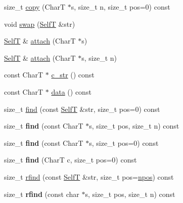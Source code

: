 \begin{CompactItemize}
\item 
size\_\-t \hyperlink{classvector__string_7583290c3d10030ebf722fcf5c5ca352}{copy} (CharT $\ast$s, size\_\-t n, size\_\-t pos=0) const 
\item 
void \hyperlink{classvector__string_a18b53a78ca97187d7145d9c004f5d54}{swap} (\hyperlink{classvector__string}{SelfT} \&str)
\item 
\hyperlink{classvector__string}{SelfT} \& \hyperlink{classvector__string_f0a88c736a417b3ba61ac3b5231b0fa7}{attach} (CharT $\ast$s)
\item 
\hyperlink{classvector__string}{SelfT} \& \hyperlink{classvector__string_2be6a4b71a784962fc9c8b619cf210d6}{attach} (CharT $\ast$s, size\_\-t n)
\item 
const CharT $\ast$ \hyperlink{classvector__string_77c74227c7fe23929099157581a23fd3}{c\_\-str} () const 
\item 
const CharT $\ast$ \hyperlink{classvector__string_96e3871846c162930623048ce8e053f1}{data} () const 
\item 
size\_\-t \hyperlink{classvector__string_5e64e995b1eea8c254bb5ade28fcbf0b}{find} (const \hyperlink{classvector__string}{SelfT} \&str, size\_\-t pos=0) const 
\item 
\hypertarget{classvector__string_b33895b9de08abfabe0cfba9581d91af}{
size\_\-t \textbf{find} (const CharT $\ast$s, size\_\-t pos, size\_\-t n) const }
\label{classvector__string_b33895b9de08abfabe0cfba9581d91af}

\item 
\hypertarget{classvector__string_799209bb6ba81df8147b7ab841efc557}{
size\_\-t \textbf{find} (const CharT $\ast$s, size\_\-t pos=0) const }
\label{classvector__string_799209bb6ba81df8147b7ab841efc557}

\item 
\hypertarget{classvector__string_a0efd758ef7648a13d8ec7b558817330}{
size\_\-t \textbf{find} (CharT c, size\_\-t pos=0) const }
\label{classvector__string_a0efd758ef7648a13d8ec7b558817330}

\item 
size\_\-t \hyperlink{classvector__string_75a476214f4b7888df557f566aa51b0a}{rfind} (const \hyperlink{classvector__string}{SelfT} \&str, size\_\-t pos=\hyperlink{classvector__string_073b48043937e79ead0703a49426be1a}{npos}) const 
\item 
\hypertarget{classvector__string_f9888434ea8216bee4def7d0af0fe9dd}{
size\_\-t \textbf{rfind} (const char $\ast$s, size\_\-t pos, size\_\-t n) const }
\label{classvector__string_f9888434ea8216bee4def7d0af0fe9dd}


\end{CompactItemize}
